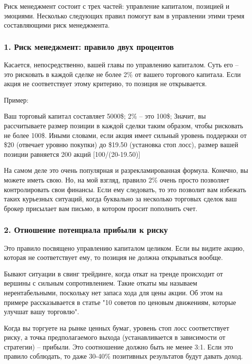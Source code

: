 \documentclass[a5paper]{article}
\begin{document}
Риск менеджмент состоит с трех частей: управление капиталом, позицией
и эмоциями. Несколько следующих правил помогут вам в управлении этими
тремя составляющими риск менеджмента.

\subsubsection{1. Риск менеджмент: правило двух процентов}

Касается, непосредственно, вашей главы по управлению капиталом. Суть его – это рисковать в каждой сделке не более 2\% от вашего торгового капитала. Если акция не соответствует этому критерию, то позиция не открывается.

Пример:

    Ваш торговый капитал составляет 5000\$; 2\% – это 100\$;
    Значит, вы рассчитываете размер позиции в каждой сделки таким образом, чтобы рисковать не более 100\$. Иными словами, если акция имеет сильный уровень поддержки от \$20 (отвечает уровню покупки) до \$19.50 (установка стоп лосс),  размер вашей позиции равняется 200 акций [100/(20-19.50)]

На самом деле это очень популярная и разрекламированная
формула. Конечно, вы можете иметь свою. Но, на мой взгляд, правило 2\% очень просто позволяет контролировать свои финансы. Если ему следовать, то это позволит вам избежать таких курьезных ситуаций, когда буквально за несколько торговых сделок ваш брокер присылает вам письмо, в котором просит пополнить счет.

\subsubsection{2. Отношение потенциала прибыли к риску}

Это правило посвящено управлению капиталом целиком. Если вы видите акцию, которая не соответствует ему, то позиция не должна открываться вообще.

Бывают ситуации в свинг трейдинге, когда откат на тренде происходит от вершины с сильным сопротивлением. Такие откаты мы называем нерентабельными, поскольку нет запаса хода для цены акции. Об этом на примере рассказывается в статье "10 советов по ценовым движениям, которые улучшат вашу торговлю".

Когда вы торгуете на рынке ценных бумаг, уровень стоп лосс соответствует риску, а точка предполагаемого выхода (устанавливается в зависимости от стратегии) – прибыли. Это соотношение должно быть не менее 3:1. Если это правило соблюдать, то даже 30-40\% позитивных результатов будут давать доход.
\end{document}
